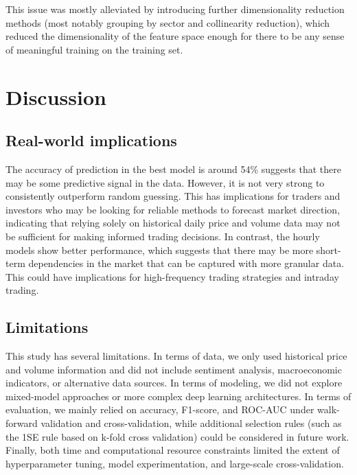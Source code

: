 \documentclass[11pt]{article}
\begin{document}
This issue was mostly alleviated by introducing further dimensionality reduction methods (most notably grouping by sector and collinearity reduction), which reduced the dimensionality of the feature space enough for there to be any sense of meaningful training on the training set.

\section{Discussion}


\subsection{Real-world implications}
 The accuracy of prediction in the best model is around 54\% suggests that there may be some predictive signal in the data. However, it is not very strong to consistently outperform random guessing. This has implications for traders and investors who may be looking for reliable methods to forecast market direction, indicating that relying solely on historical daily price and volume data may not be sufficient for making informed trading decisions. In contrast, the hourly models show better performance, which suggests that there may be more short-term dependencies in the market that can be captured with more granular data. This could have implications for high-frequency trading strategies and intraday trading.

\subsection{Limitations}

  This study has several limitations. In terms of data, we only used historical price and volume information and did not include sentiment analysis, macroeconomic indicators, or alternative data sources. In terms of modeling, we did not explore mixed-model approaches or more complex deep learning architectures. In terms of evaluation, we mainly relied on accuracy, F1-score, and ROC-AUC under walk-forward validation and cross-validation, while additional selection rules (such as the 1SE rule based on k-fold cross validation) could be considered in future work. Finally, both time and computational resource constraints limited the extent of hyperparameter tuning, model experimentation, and large-scale cross-validation.
\end{document}
